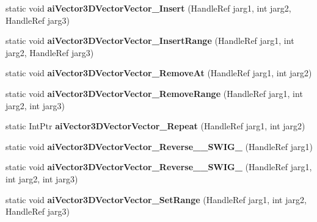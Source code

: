 \begin{DoxyCompactItemize}
\item 
\hypertarget{class_assimp_p_i_n_v_o_k_e_a9da63cc13dbf3309860c6c3e47d5676a}{static void {\bfseries ai\+Vector3\+D\+Vector\+Vector\+\_\+\+Insert} (Handle\+Ref jarg1, int jarg2, Handle\+Ref jarg3)}\label{class_assimp_p_i_n_v_o_k_e_a9da63cc13dbf3309860c6c3e47d5676a}

\item 
\hypertarget{class_assimp_p_i_n_v_o_k_e_adda2241646b50600503799d178879bc8}{static void {\bfseries ai\+Vector3\+D\+Vector\+Vector\+\_\+\+Insert\+Range} (Handle\+Ref jarg1, int jarg2, Handle\+Ref jarg3)}\label{class_assimp_p_i_n_v_o_k_e_adda2241646b50600503799d178879bc8}

\item 
\hypertarget{class_assimp_p_i_n_v_o_k_e_a7167f85c42069a979b0b0989d4b0d6b6}{static void {\bfseries ai\+Vector3\+D\+Vector\+Vector\+\_\+\+Remove\+At} (Handle\+Ref jarg1, int jarg2)}\label{class_assimp_p_i_n_v_o_k_e_a7167f85c42069a979b0b0989d4b0d6b6}

\item 
\hypertarget{class_assimp_p_i_n_v_o_k_e_a4dd11f1aeaca91289e4a1ff524408842}{static void {\bfseries ai\+Vector3\+D\+Vector\+Vector\+\_\+\+Remove\+Range} (Handle\+Ref jarg1, int jarg2, int jarg3)}\label{class_assimp_p_i_n_v_o_k_e_a4dd11f1aeaca91289e4a1ff524408842}

\item 
\hypertarget{class_assimp_p_i_n_v_o_k_e_a5ef404a1c5321005ffd73d08e067d4aa}{static Int\+Ptr {\bfseries ai\+Vector3\+D\+Vector\+Vector\+\_\+\+Repeat} (Handle\+Ref jarg1, int jarg2)}\label{class_assimp_p_i_n_v_o_k_e_a5ef404a1c5321005ffd73d08e067d4aa}

\item 
\hypertarget{class_assimp_p_i_n_v_o_k_e_a446bb59e204101041620c35efe935a5e}{static void {\bfseries ai\+Vector3\+D\+Vector\+Vector\+\_\+\+Reverse\+\_\+\+\_\+\+S\+W\+I\+G\+\_} (Handle\+Ref jarg1)}\label{class_assimp_p_i_n_v_o_k_e_a446bb59e204101041620c35efe935a5e}

\item 
\hypertarget{class_assimp_p_i_n_v_o_k_e_afbc36139096753499bf65ea5e08b303e}{static void {\bfseries ai\+Vector3\+D\+Vector\+Vector\+\_\+\+Reverse\+\_\+\+\_\+\+S\+W\+I\+G\+\_} (Handle\+Ref jarg1, int jarg2, int jarg3)}\label{class_assimp_p_i_n_v_o_k_e_afbc36139096753499bf65ea5e08b303e}

\item 
\hypertarget{class_assimp_p_i_n_v_o_k_e_aff1b7e93d37929702c037b4badc441f4}{static void {\bfseries ai\+Vector3\+D\+Vector\+Vector\+\_\+\+Set\+Range} (Handle\+Ref jarg1, int jarg2, Handle\+Ref jarg3)}\label{class_assimp_p_i_n_v_o_k_e_aff1b7e93d37929702c037b4badc441f4}


\end{DoxyCompactItemize}
